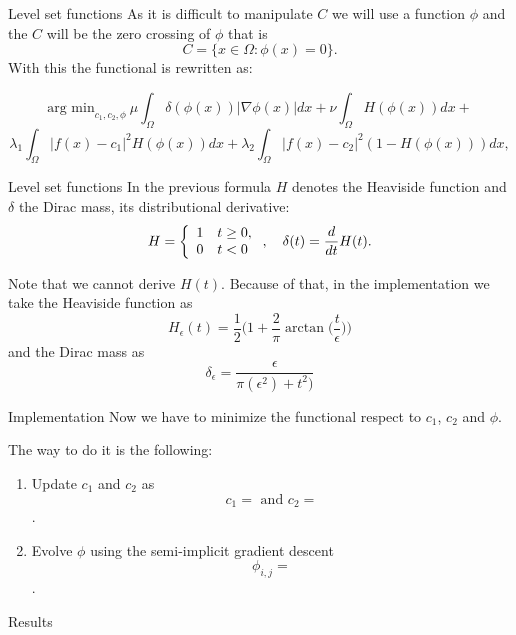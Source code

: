 \documentclass[11pt]{beamer}
\begin{document}
\begin{frame}{Level set functions}
As it is difficult to manipulate $C$ we will use a function $\phi$ and the $C$ will be the zero crossing of $\phi$ that is 
$$C = \{x\in \Omega:\phi(x) = 0\}.$$
With this the functional is rewritten as:

$$\text{arg min}_{c_1, c_2, \phi}\ \mu \int_{\Omega}\delta(\phi(x))|\nabla\phi(x)|dx+\nu \int_{\Omega}H(\phi(x))dx +$$$$ \lambda_1\int_{\Omega}|f(x)-c_1|^2H(\phi(x))dx + \lambda_2\int_{\Omega}|f(x) -c_2|^2(1-H(\phi(x)))dx,$$
\end{frame}
\begin{frame}{Level set functions}
In the previous formula $H$ denotes the Heaviside function and $\delta$ the Dirac mass, its distributional derivative:
$$ H = \left\lbrace\begin{array}{l l}
1&t\geq 0,\\
0 & t<0
\end{array}\right. ,\quad \delta(t) = \frac{d}{dt}H(t).$$

Note that we cannot derive $H(t)$. Because of that, in the implementation we take the Heaviside function as
$$H_{\epsilon}(t) = \frac{1}{2}\bigg(1 + \frac{2}{\pi}\arctan \bigg(\frac{t}{\epsilon}\bigg)\bigg)$$
and the Dirac mass as
$$\delta_{\epsilon} = \frac{\epsilon}{\pi(\epsilon^2)+t^2)}$$
\end{frame}



\begin{frame}{Implementation}
Now we have to minimize the functional respect to $c_1$, $c_2$ and $\phi$.

The way to do it is the following:
\begin{enumerate}
\item Update $c_1$ and $c_2$ as $$c_1 =  \text{ and } c_2 = $$.
\item Evolve $\phi$ using the semi-implicit gradient descent $$\phi_{i,j} = $$. 
\end{enumerate}
\end{frame}

\begin{frame}{Results}

\end{frame}
\end{document}
